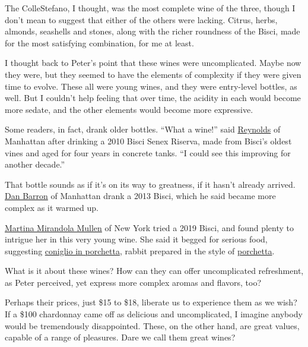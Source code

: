 The ColleStefano, I thought, was the most complete wine of the three,
though I don't mean to suggest that either of the others were lacking.
Citrus, herbs, almonds, seashells and stones, along with the richer
roundness of the Bisci, made for the most satisfying combination, for me
at least.

I thought back to Peter's point that these wines were uncomplicated.
Maybe now they were, but they seemed to have the elements of complexity
if they were given time to evolve. These all were young wines, and they
were entry-level bottles, as well. But I couldn't help feeling that over
time, the acidity in each would become more sedate, and the other
elements would become more expressive.

Some readers, in fact, drank older bottles. ``What a wine!'' said
\href{https://www.nytimes.com/2020/07/02/dining/drinks/wine-school-assignment-verdicchio-di-matelica.html\#commentsContainer\&permid=107985862}{Reynolds}
of Manhattan after drinking a 2010 Bisci Senex Riserva, made from
Bisci's oldest vines and aged for four years in concrete tanks. ``I
could see this improving for another decade.''

That bottle sounds as if it's on its way to greatness, if it hasn't
already arrived.
\href{https://www.nytimes.com/2020/07/02/dining/drinks/wine-school-assignment-verdicchio-di-matelica.html\#commentsContainer\&permid=107955758}{Dan
Barron} of Manhattan drank a 2013 Bisci, which he said became more
complex as it warmed up.

\href{https://www.nytimes.com/2020/07/02/dining/drinks/wine-school-assignment-verdicchio-di-matelica.html\#commentsContainer\&permid=108292784}{Martina
Mirandola Mullen} of New York tried a 2019 Bisci, and found plenty to
intrigue her in this very young wine. She said it begged for serious
food, suggesting
\href{https://ouritaliantable.com/a-modern-coniglio-in-porchetta/}{coniglio
in porchetta}, rabbit prepared in the style of
\href{https://cooking.nytimes.com/recipes/1017068-porchetta-pork-roast?action=click\&module=Collection\%20Page\%20Recipe\%20Card\&region=Project\%20Cooking\&pgType=collection\&rank=33}{porchetta}.

What is it about these wines? How can they can offer uncomplicated
refreshment, as Peter perceived, yet express more complex aromas and
flavors, too?

Perhaps their prices, just \$15 to \$18, liberate us to experience them
as we wish? If a \$100 chardonnay came off as delicious and
uncomplicated, I imagine anybody would be tremendously disappointed.
These, on the other hand, are great values, capable of a range of
pleasures. Dare we call them great wines?

